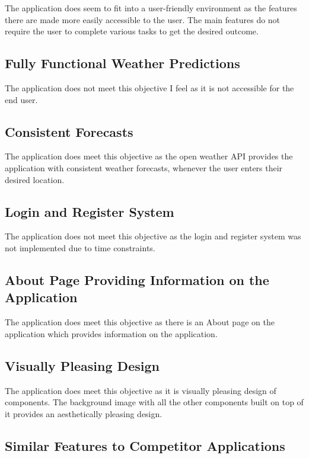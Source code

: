 The application does seem to fit into a user-friendly environment as the features there are made more easily accessible to the user. The main features do not require the user to complete various tasks to get the desired outcome. 

\subsection{Fully Functional Weather Predictions}

The application does not meet this objective I feel as it is not accessible for the end user. 

\subsection{Consistent Forecasts}

The application does meet this objective as the open weather API provides the application with consistent weather forecasts, whenever the user enters their desired location. 

\subsection{Login and Register System}

The application does not meet this objective as the login and register system was not implemented due to time constraints. 

\subsection{About Page Providing Information on the Application}

The application does meet this objective as there is an About page on the application which provides information on the application.

\subsection{Visually Pleasing Design}

The application does meet this objective as it is visually pleasing design of components. The background image with all the other components built on top of it provides an aesthetically pleasing design.

\subsection{Similar Features to Competitor Applications}

